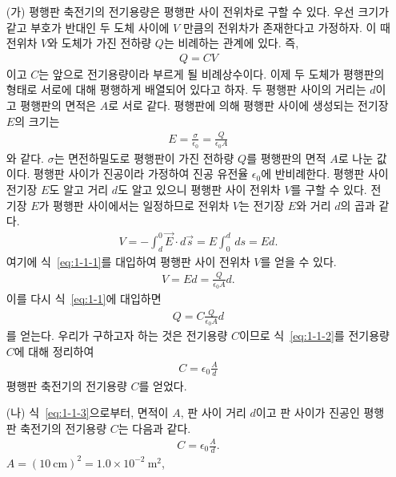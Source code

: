 \documentclass[tightenlines,floatfix,nofootinbib,superscriptaddress,fleqn]{revtex4-2}
\begin{document}
\vspace{1.cm}
\begin{itemize}
  \item[(가)] 평행판 축전기의 전기용량은 평행판 사이 전위차로 구할 수 있다. 우선 
  크기가 같고 부호가 반대인 두 도체 사이에 $V$ 만큼의 전위차가 존재한다고 가정하자.
  이 때 전위차 $V$와 도체가 가진 전하량 $Q$는 비례하는 관계에 있다. 즉,
   \begin{align}\label{eq:1-1}
    Q = CV
   \end{align}
   이고 $C$는 앞으로 전기용량이라 부르게 될 비례상수이다. 이제 두 도체가 평행판의
   형태로 서로에 대해 평행하게 배열되어 있다고 하자. 두 평행판 사이의 거리는 $d$이고
   평행판의 면적은 $A$로 서로 같다. 평행판에 의해 평행판 사이에 생성되는 전기장 $E$의 크기는
   \begin{align}\label{eq:1-1-1}
    E = \frac{\sigma}{\epsilon_0} = \frac{Q}{\epsilon_0 A}
   \end{align}
   와 같다. $\sigma$는 면전하밀도로 평행판이 가진 전하량 $Q$를 평행판의 면적 $A$로 나눈 
   값이다. 평행판 사이가 진공이라 가정하여 진공 유전율 $\epsilon_0$에 반비례한다.
   평행판 사이 전기장 $E$도 알고 거리 $d$도 알고 있으니 평행판 사이 전위차 $V$를 구할 수 있다.
   전기장 $E$가 평행판 사이에서는 일정하므로 전위차 $V$는 전기장 $E$와 거리 $d$의 곱과 같다.
   \begin{align}
    V = -\int_d^0 \vec{E}\cdot d\vec{s} = E\int_0^d\,ds=Ed.
   \end{align}
   여기에 식~\eqref{eq:1-1-1}를 대입하여 평행판 사이 전위차 $V$를 얻을 수 있다.
   \begin{align}
    V = Ed = \frac{Q}{\epsilon_0 A}d.
   \end{align}
   이를 다시 식~\eqref{eq:1-1}에 대입하면
   \begin{align}\label{eq:1-1-2}
    Q = C\frac{Q}{\epsilon_0 A}d
   \end{align}
   를 얻는다. 우리가 구하고자 하는 것은 전기용량 $C$이므로 식~\eqref{eq:1-1-2}를 전기용량 
   $C$에 대해 정리하여
   \begin{align}\label{eq:1-1-3}
    C = \epsilon_0\frac{A}{d}
   \end{align}
   평행판 축전기의 전기용량 $C$를 얻었다.
  \item[(나)]식~\eqref{eq:1-1-3}으로부터, 면적이 $A$, 판 사이 거리 $d$이고 판 사이가 
  진공인 평행판 축전기의 전기용량 $C$는 다음과 같다.
  \begin{align}
    C = \epsilon_0\frac{A}{d}.
  \end{align}
  $A=(10~\mathrm{cm})^2=1.0\times 10^{-2}~\mathrm{m^2}$, 

\end{itemize}
\end{document}
